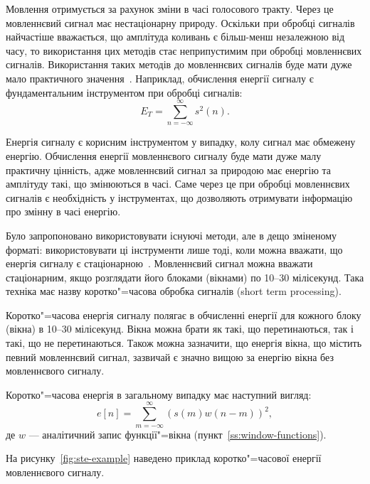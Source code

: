     Мовлення отримується за рахунок зміни в часі голосового тракту.
    Через це мовленнєвий сигнал має нестаціонарну природу.
    Оскільки при обробці сигналів найчастіше вважається, що амплітуда коливань є більш-менш незалежною від часу, то
    використання цих методів стає неприпустимим при обробці мовленнєвих сигналів.
    Використання таких методів до мовленнєвих сигналів буде мати дуже мало практичного значення~\cite{book8}.
    Наприклад, обчислення енергії сигналу є фундаментальним інструментом при обробці сигналів:
    \begin{equation}
        E_T = \sum\limits_{n = {-\infty}}^\infty{s^2\left(n\right)}.
    \end{equation}

    Енергія сигналу є корисним інструментом у випадку, колу сигнал має обмежену енергію.
    Обчислення енергії мовленнєвого сигналу буде мати дуже малу практичну цінність, адже мовленнєвий сигнал за
    природою має енергію та амплітуду такі, що змінюються в часі.
    Саме через це при обробці мовленнєвих сигналів є необхідність у інструментах, що дозволяють отримувати інформацію
    про змінну в часі енергію.

    Було запропоновано використовувати існуючі методи, але в дещо зміненому форматі: використовувати ці інструменти
    лише тоді, коли можна вважати, що енергія сигналу є стаціонарною~\cite{book9}.
    Мовленнєвий сигнал можна вважати стаціонарним, якщо розглядати його блоками (вікнами) по 10--30 мілісекунд.
    Така техніка має назву коротко"=часова обробка сигналів (short term processing).

    Коротко"=часова енергія сигналу полягає в обчисленні енергії для кожного блоку (вікна) в 10--30 мілісекунд.
    Вікна можна брати як такі, що перетинаються, так і такі, що не перетинаються.
    Також можна зазначити, що енергія вікна, що містить певний мовленнєвий сигнал, зазвичай є значно вищою за енергію
    вікна без мовленнєвого сигналу.

    Коротко"=часова енергія в загальному випадку має наступний вигляд:
    \begin{equation}
        e[ n ] = \sum\limits_{m=-\infty}^\infty\left(s\left(m\right) w\left(n - m\right)\right)^2,
    \end{equation}
    де $w$ --- аналітичний запис функції"=вікна (пункт~\ref{ss:window-functions}).

    На рисунку~\ref{fig:ste-example} наведено приклад коротко"=часової енергії мовленнєвого сигналу.


